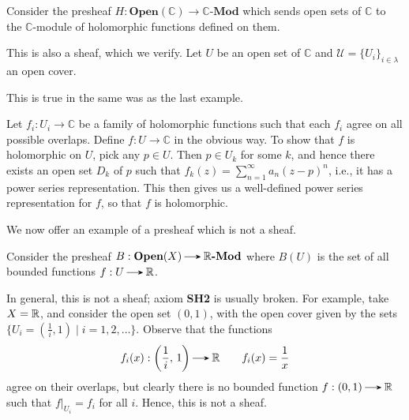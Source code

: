 \begin{example}
    Consider the presheaf $H: \textbf{Open}(\mathbb{C}) \to \mathbb{C}\textbf{-Mod}$ 
    which sends open sets of $\mathbb{C}$ to the $\mathbb{C}$-module of holomorphic 
    functions defined on them.

    This is also a sheaf, which we verify. Let $U$ be an open set of $\mathbb{C}$ 
    and $\mathcal{U}=\{U_i\}_{i\in\lambda}$ an open cover.
    \begin{description}
        \itemsep 0.25cm
        \item[(SH1)] This is true in the same was as the last example. 
        
        \item[(SH2)] 
        Let $f_i: U_i \to \mathbb{C}$ be a family of holomorphic functions
        such that each $f_i$ agree on all possible overlaps. Define $f: U \to \mathbb{C}$ in 
        the obvious way. To show that $f$ is holomorphic on $U$,
        pick any $p \in U$. Then $p \in U_k$ for some $k$, and hence 
        there exists an open set $D_k$ of $p$ such that 
        $f_k(z) = \sum_{n = 1}^{\infty}a_n(z - p)^n$, i.e., it has a power series 
        representation. This then gives us a well-defined power series representation 
        for $f$, so that $f$ is holomorphic.
    \end{description}
     

\end{example}



We now offer an example of a presheaf which is not a sheaf.

\begin{example}
    Consider the presheaf $B: \textbf{Open}(X) \to \rr\textbf{-Mod}$
    where $B(U)$ is the set of all bounded functions $f: U \to \rr$. 
    
    In general, this is not a sheaf; axiom \textbf{SH2} is usually 
    broken. For example, take $X = \mathbb{R}$, and consider 
    the open set $(0, 1)$, with the open cover given by 
    the sets $\{ U_i = \left(\frac{1}{i}, 1 \right) \mid i = 1, 2, \dots \}$.
    Observe that the functions 
    \[
        f_i(x): \left(\frac{1}{i},\, 1 \right) \to \rr \qquad f_i(x) = \frac{1}{x}
    \]
    agree on their overlaps, but clearly there is no bounded function 
    $f: (0, 1) \to \rr$ such that $f|_{U_i} = f_i$ for all $i$.  Hence, 
    this is not a sheaf.
\end{example}







